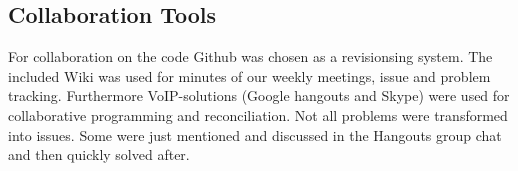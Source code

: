 \subsection{Collaboration Tools}
For collaboration on the code Github was chosen as a revisionsing system. The included Wiki was used for minutes of our weekly meetings, issue and problem tracking. Furthermore VoIP-solutions (Google hangouts and Skype) were used for collaborative programming and reconciliation. Not all problems were transformed into issues. Some were just mentioned and discussed in the Hangouts group chat and then quickly solved after.

